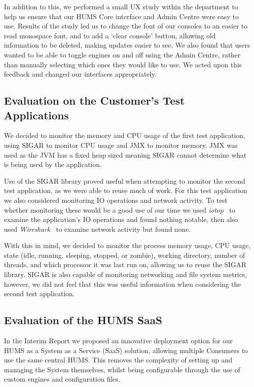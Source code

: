 \documentclass[10pt,a4paper]{article}
\begin{document}
In addition to this, we performed a small UX study within the department to help us ensure that our HUMS Core interface and Admin Centre were easy to use. Results of the study led us to change the font of our consoles to an easier to read monospace font, and to add a `clear console' button, allowing old information to be deleted, making updates easier to see. We also found that users wanted to be able to toggle engines on and off using the Admin Centre, rather than manually selecting which ones they would like to use. We acted upon this feedback and changed our interfaces appropriately.

\subsection{Evaluation on the Customer's Test Applications}
\label{sec:test_app1}

We decided to monitor the memory and CPU usage of the first test application, using SIGAR to monitor CPU usage and JMX to monitor memory. JMX was used as the JVM has a fixed heap sized meaning SIGAR cannot determine what is being used by the application. 

Use of the SIGAR library proved useful when attempting to monitor the second test application, as we were able to reuse much of work. For this test application we also considered monitoring IO operations and network activity. To test whether monitoring these would be a good use of our time we used \emph{iotop}~\cite{iotop} to examine the application's IO operations and found nothing notable, then also used \emph{Wireshark}~\cite{wireshark} to examine network activity but found none. 

With this in mind, we decided to monitor the process memory usage, CPU usage, state (idle, running, sleeping, stopped, or zombie), working directory, number of threads, and which processor it was last run on, allowing us to reuse the SIGAR library. SIGAR is also capable of monitoring networking and file system metrics, however, we did not feel that this was useful information when considering the second test application.

\subsection{Evaluation of the HUMS SaaS}
\label{sec:hums_saas}

In the Interim Report we proposed an innovative deployment option for our HUMS as a System as a Service (SaaS) solution, allowing multiple Consumers to use the same central HUMS. This removes the complexity of setting up and managing the System themselves, whilst being configurable through the use of custom engines and configuration files.
\end{document}
